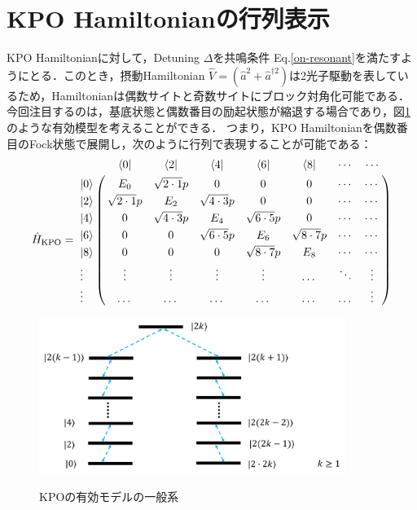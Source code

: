 \section{KPO Hamiltonianの行列表示}
KPO Hamiltonianに対して，Detuning $\Delta$を共鳴条件 Eq.\eqref{on-resonant}を満たすようにとる．このとき，摂動Hamiltonian $\hat{V}=(\hat{a}^2 + \hat{a}^{\dagger 2})$は2光子駆動を表しているため，Hamiltonianは偶数サイトと奇数サイトにブロック対角化可能である．今回注目するのは，基底状態と偶数番目の励起状態が縮退する場合であり，図\ref{fig:kpo_effective_model}のような有効模型を考えることができる．
つまり，KPO Hamiltonianを偶数番目のFock状態で展開し，次のように行列で表現することが可能である：
\begin{align}
     \hat{H}_{\rm{KPO}}=
   \bordermatrix{     
    & \bra{0} &  \bra{2} &  \bra{4}&  \bra{6}&  \bra{8}& \cdots& \cdots \cr
   \ket{0}&E_0&\sqrt{2\cdot1}p&0&0&0&\cdots& \cdots\cr
  \ket{2}&\sqrt{2\cdot1}p&E_2&\sqrt{4\cdot3}p&0&0& \cdots& \cdots\cr
  \ket{4}&0&\sqrt{4\cdot3}p&E_4&\sqrt{6\cdot5}p&0& \cdots& \cdots\cr
  \ket{6}&0&0&\sqrt{6\cdot5}p&E_6&\sqrt{8\cdot7}p& \cdots& \cdots\cr
  \ket{8}&0&0&0&\sqrt{8\cdot7}p&E_8& \cdots& \cdots\cr
  \vdots&\vdots & \vdots &\vdots  & \vdots & \dots& \ddots & \vdots \cr
  \vdots&\dots & \dots&\dots &\dots & \dots& \dots  & \vdots\cr
            }
\end{align}


\begin{figure}[h]
\centering
		\includegraphics[width=10cm]{file/fig/effective_model/kpo_effective_model.png}\\
\caption{KPOの有効モデルの一般系}
\label{fig:kpo_effective_model}
\end{figure}

